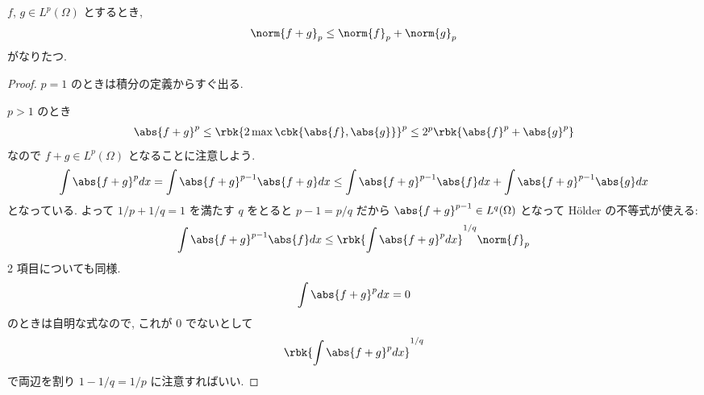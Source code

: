 \documentclass[openany, a4paper, oneside]{jsbook}
\begin{document}
\begin{thm}
 $f$, $g \in L^p(\Omega)$ とするとき,
 \begin{align}
  \norm{f + g}_p
  \leq
  \norm{f}_p + \norm{g}_p
 \end{align}
 がなりたつ.
\end{thm}
\begin{proof}
$p=1$ のときは積分の定義からすぐ出る.

$p > 1$ のとき
\begin{align}
 \abs{f + g}^p
 \le
 \rbk{2 \max \cbk{\abs{f}, \abs{g}}}^p
 \le
 2^p \rbk{\abs{f}^p + \abs{g}^p}
\end{align}
なので $f + g \in L^p(\Omega)$ となることに注意しよう.
\begin{align}
 \int \abs{f + g}^p dx
 =
 \int \abs{f + g}^{p-1} \abs{f + g} dx
 \le
 \int \abs{f + g}^{p-1} \abs{f}dx + \int \abs{f + g}^{p-1} \abs{g} dx
\end{align}
となっている.
よって $1/p + 1/q = 1$ を満たす $q$ をとると $p-1 = p/q$ だから
$\abs{f + g}^{p-1} \in L^q (\Omega)$ となって H\"older の不等式が使える:
\begin{align}
 \int \abs{f + g}^{p-1} \abs{f} dx
 \le
 \rbk{\int \abs{f + g}^p dx}^{1/q} \norm{f}_p
\end{align}
2 項目についても同様.
\begin{align}
 \int \abs{f + g}^p dx
 =
 0
\end{align}
のときは自明な式なので, これが $0$ でないとして
\begin{align}
 \rbk{\int \abs{f + g}^p dx}^{1/q}
\end{align}
で両辺を割り $1-1/q = 1/p$ に注意すればいい.
\end{proof}
\end{document}
